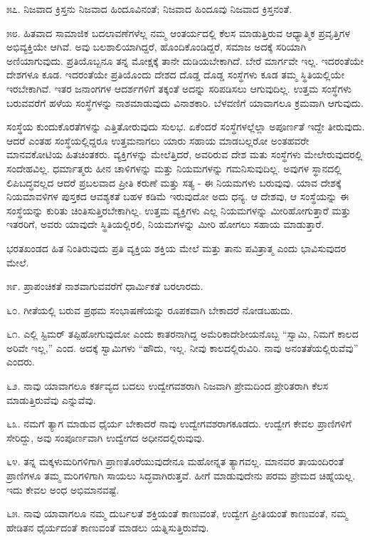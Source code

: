 ೫೭. ನಿಜವಾದ ಕ್ರಿಸ್ತನು ನಿಜವಾದ ಹಿಂದೂವಿನಂತೆ; ನಿಜವಾದ ಹಿಂದೂವು ನಿಜವಾದ ಕ್ರಿಸ್ತನಂತೆ.

೫೮. ಹಿತವಾದ ಸಾಮಾಜಿಕ ಬದಲಾವಣೆಗಳೆಲ್ಲ ನಮ್ಮ ಆಂತರ್ಯದಲ್ಲಿ ಕೆಲಸ ಮಾಡುತ್ತಿರುವ ಆಧ್ಯಾತ್ಮಿಕ ಪ್ರವೃತ್ತಿಗಳ ಅಭಿವ್ಯಕ್ತಿಯೇ ಆಗಿವೆ. ಅವು ಬಲಶಾಲಿಯಾಗಿದ್ದರೆ, ಹೊಂದಿಕೊಂಡಿದ್ದರೆ, ಸಮಾಜ ಅದಕ್ಕೆ ಸರಿಯಾಗಿ ಅಣಿಯಾಗುವುದು. ಪ್ರತಿಯೊಬ್ಬನೂ ತನ್ನ ಮೋಕ್ಷಕ್ಕೆ ತಾನೇ ದುಡಿಯಬೇಕಾಗಿದೆ. ಬೇರೆ ಮಾರ್ಗವೇ ಇಲ್ಲ. ಇದರಂತೆಯೇ ದೇಶಗಳೂ ಕೂಡ. ಇದರಂತೆಯೇ ಪ್ರತಿಯೊಂದು ದೇಶದ ದೊಡ್ಡ ದೊಡ್ಡ ಸಂಸ್ಥೆಗಳು ಕೂಡ ತಮ್ಮ ಸ್ಥಿತಿಯಲ್ಲಿಯೇ ಇರಬೇಕಾಗಿವೆ. ಇತರ ಜನಾಂಗಗಳ ಆದರ್ಶಗಳಿಗೆ ತಕ್ಕಂತೆ ಅದನ್ನು ಸರಿಪಡಿಸಲು ಆಗುವುದಿಲ್ಲ. ಉತ್ತಮ ಸಂಸ್ಥೆಗಳು ಬರುವವರೆಗೆ ಹಳೆಯ ಸಂಸ್ಥೆಗಳನ್ನು ನಾಶಮಾಡುವುದು ವಿನಾಶಕಾರಿ. ಬೆಳವಣಿಗೆ ಯಾವಾಗಲೂ ಕ್ರಮವಾಗಿ ಆಗುವುದು.

ಸಂಸ್ಥೆಯ ಕುಂದುಕೊರತೆಗಳನ್ನು ಎತ್ತಿತೋರುವುದು ಸುಲಭ. ಏಕೆಂದರೆ ಸಂಸ್ಥೆಗಳಲ್ಲೆಲ್ಲಾ ಅಪೂರ್ಣತೆ ಇದ್ದೇ ತೀರುವುದು. ಆದರೆ ಎಂತಹ ಸಂಸ್ಥೆಯಲ್ಲಿದ್ದರೂ ಉತ್ತಮನಾಗಲು ಯಾರು ಸಹಾಯ ಮಾಡಬಲ್ಲರೋ ಅಂತಹವರೇ ಮಾನವಕೋಟಿಯ ಹಿತಚಿಂತಕರು. ವ್ಯಕ್ತಿಗಳನ್ನು ಮೇಲೆತ್ತಿದರೆ, ಅವರಿರುವ ದೇಶ ಮತು ಸಂಸ್ಥೆಗಳು ಮೇಲೇರುವುದರಲ್ಲಿ ಸಂದೇಹವಿಲ್ಲ. ಧರ್ಮಾತ್ಮರು ಹೀನ ಚಾಳಿಗಳನ್ನು ಮತ್ತು ನಿಯಮಗಳನ್ನು ಗಮನಿಸುವುದಿಲ್ಲ. ಅವುಗಳ ಸ್ಥಾನದಲ್ಲಿ ಲಿಪಿಬದ್ಧವಲ್ಲದ ಆದರೆ ಪ್ರಬಲವಾದ ಪ್ರೀತಿ ಕರುಣೆ ಮತ್ತು ಸತ್ಯ - ಈ ನಿಯಮಗಳು ಬರುವುವು. ಯಾವ ದೇಶಕ್ಕೆ ನಿಯಮಾವಳಿಗಳ ಪುಸ್ತಕದ ಆವಶ್ಯಕತೆ ಬಹಳ ಕಡಿಮೆ ಇರುವುದೋ ಅದು ಧನ್ಯ. ಆ ದೇಶವು, ಆ ಸಂಸ್ಥೆಯನ್ನು ಈ ಸಂಸ್ಥೆಯನ್ನು ಕುರಿತು ಚಿಂತಿಸುತ್ತಿರಬೇಕಾಗಿಲ್ಲ. ಉತ್ತಮ ವ್ಯಕ್ತಿಗಳು ಎಲ್ಲ ನಿಯಮಗಳನ್ನು ಮೀರಿಹೋಗುತ್ತಾರೆ ಮತ್ತು ಇತರರಿಗೆ, ಅವರು ಯಾವುದೇ ಸ್ಥಿತಿಯಲ್ಲಿರಲಿ, ನಿಯಮಗಳನ್ನು ಮೀರಿ ಹೋಗಲು ಸಹಾಯ ಮಾಡುತ್ತಾರೆ.

ಭರತಖಂಡದ ಹಿತ ನಿಂತಿರುವುದು ಪ್ರತಿ ವ್ಯಕ್ತಿಯ ಶಕ್ತಿಯ ಮೇಲೆ ಮತ್ತು ತಾನು ಪವಿತ್ರಾತ್ಮ ಎಂದು ಭಾವಿಸುವುದರ ಮೇಲೆ.

೫೯. ಪ್ರಾಪಂಚಿಕತೆ ನಾಶವಾಗುವವರೆಗೆ ಧಾರ್ಮಿಕತೆ ಬರಲಾರದು.

೬೦. ಗೀತೆಯಲ್ಲಿ ಬರುವ ಪ್ರಥಮ ಸಂಭಾಷಣೆಯನ್ನು ರೂಪಕವಾಗಿ ಬೇಕಾದರೆ ನೋಡಬಹುದು.

೬೧. ಎಲ್ಲಿ ಸ್ಟಿಮರ್ ತಪ್ಪಿಹೋಗುವುದೋ ಎಂದು ಕಾತರನಾಗಿದ್ದ ಅಮೆರಿಕಾದೇಶೀಯನೊಬ್ಬ “ಸ್ವಾಮಿ, ನಿಮಗೆ ಕಾಲದ ಅರಿವೇ ಇಲ್ಲ,” ಎಂದ. ಅದಕ್ಕೆ ಸ್ವಾಮಿಗಳು “ಹೌದು, ಇಲ್ಲ. ನೀವು ಕಾಲದಲ್ಲಿರುವಿರಿ. ನಾವು ಅನಂತತೆಯಲ್ಲಿರುವೆವು” ಎಂದರು.

೬೨. ನಾವು ಯಾವಾಗಲೂ ಕರ್ತವ್ಯದ ಬದಲು ಉದ್ವೇಗವಶರಾಗಿ ನಿಜವಾಗಿ ಪ್ರೇಮದಿಂದ ಪ್ರೇರಿತರಾಗಿ ಕೆಲಸ ಮಾಡುತ್ತಿರುವೆವು ಎನ್ನುವೆವು.

೬೩. ನಮಗೆ ತ್ಯಾಗ ಮಾಡುವ ಧೈರ್ಯ ಬೇಕಾದರೆ ನಾವು ಉದ್ವೇಗವಶರಾಗಕೂಡದು. ಉದ್ವೇಗ ಕೇವಲ ಪ್ರಾಣಿಗಳಿಗೆ ಸೇರಿದ್ದು, ಅವು ಸಂಪೂರ್ಣವಾಗಿ ಉದ್ವೇಗದ ಅಧೀನದಲ್ಲಿರುವುವು.

೬೪. ತನ್ನ ಮಕ್ಕಳುಮರಿಗಳಿಗಾಗಿ ಪ್ರಾಣತೊರೆಯುವುದೇನೂ ಮಹೋನ್ನತ ತ್ಯಾಗವಲ್ಲ. ಮಾನವರ ತಾಯಂದಿರಂತೆ ಪ್ರಾಣಿಗಳೂ ತಮ್ಮ ಮರಿಗಳಿಗಾಗಿ ಸಾಯಲು ಸಿದ್ಧವಾಗಿರುತ್ತವೆ. ಹೀಗೆ ಮಾಡುವುದೇನು ಪರಮ ಪ್ರೇಮದ ಚಿಹ್ನೆಯಲ್ಲ. ಇದು ಕೇವಲ ಅಂಧ ಅಭಿಮಾನವಷ್ಟೆ.

೬೫. ನಾವು ಯಾವಾಗಲೂ ನಮ್ಮ ದುರ್ಬಲತೆ ಶಕ್ತಿಯಂತೆ ಕಾಣುವಂತೆ, ಉದ್ವೇಗ ಪ್ರೀತಿಯಂತೆ ಕಾಣುವಂತೆ, ನಮ್ಮ ಹೇಡಿತನ ಧೈರ್ಯದಂತೆ ಕಾಣುವಂತೆ ಮಾಡಲು ಯತ್ನಿಸುತ್ತಿರುವೆವು.


